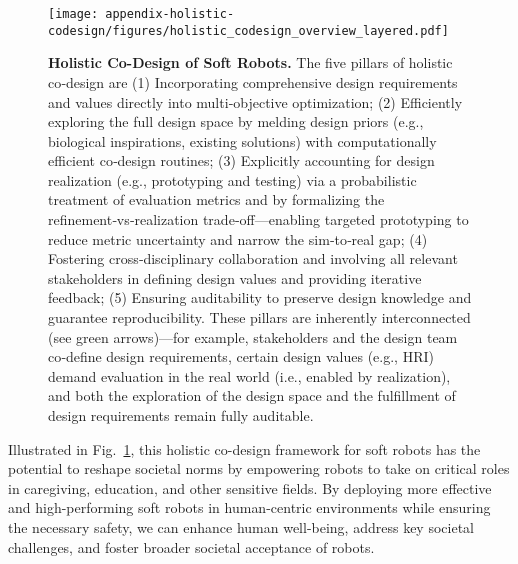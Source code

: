 \begin{figure}[tb]
    \centering
    \texttt{[image: appendix-holistic-codesign/figures/holistic\_codesign\_overview\_layered.pdf]}
    \caption{
    \textbf{Holistic Co-Design of Soft Robots.}
    The five pillars of holistic co‑design are (1) Incorporating comprehensive design requirements and values directly into multi‑objective optimization; (2) Efficiently exploring the full design space by melding design priors (e.g., biological inspirations, existing solutions) with computationally efficient co‑design routines; (3) Explicitly accounting for design realization (e.g., prototyping and testing) via a probabilistic treatment of evaluation metrics and by formalizing the refinement‑vs‑realization trade‑off—enabling targeted prototyping to reduce metric uncertainty and narrow the sim‑to‑real gap; (4) Fostering cross‑disciplinary collaboration and involving all relevant stakeholders in defining design values and providing iterative feedback; (5) Ensuring auditability to preserve design knowledge and guarantee reproducibility.
    These pillars are inherently interconnected (see green arrows)—for example, stakeholders and the design team co‑define design requirements, certain design values (e.g., HRI) demand evaluation in the real world (i.e., enabled by realization), and both the exploration of the design space and the fulfillment of design requirements remain fully auditable.
    }
    \label{fig:apx:holisticcodesign:overview}
\end{figure}

Illustrated in Fig.~\ref{fig:apx:holisticcodesign:overview}, this holistic co-design framework for soft robots has the potential to reshape societal norms by empowering robots to take on critical roles in caregiving, education, and other sensitive fields. By deploying more effective and high-performing soft robots in human-centric environments while ensuring the necessary safety, we can enhance human well-being, address key societal challenges, and foster broader societal acceptance of robots.